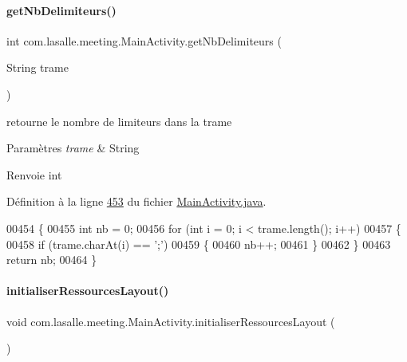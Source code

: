 \paragraph{\texorpdfstring{get\+Nb\+Delimiteurs()}{getNbDelimiteurs()}}
{\footnotesize\ttfamily int com.\+lasalle.\+meeting.\+Main\+Activity.\+get\+Nb\+Delimiteurs (\begin{DoxyParamCaption}\item[{String}]{trame }\end{DoxyParamCaption})\hspace{0.3cm}{\ttfamily [private]}}



retourne le nombre de limiteurs dans la trame 


\begin{DoxyParams}{Paramètres}
{\em trame} & String \\
\hline
\end{DoxyParams}
\begin{DoxyReturn}{Renvoie}
int 
\end{DoxyReturn}


Définition à la ligne \hyperlink{_main_activity_8java_source_l00453}{453} du fichier \hyperlink{_main_activity_8java_source}{Main\+Activity.\+java}.


\begin{DoxyCode}
00454     \{
00455         \textcolor{keywordtype}{int} nb = 0;
00456         \textcolor{keywordflow}{for} (\textcolor{keywordtype}{int} i = 0; i < trame.length(); i++)
00457         \{
00458             \textcolor{keywordflow}{if} (trame.charAt(i) == \textcolor{charliteral}{';'})
00459             \{
00460                 nb++;
00461             \}
00462         \}
00463         \textcolor{keywordflow}{return} nb;
00464     \}
\end{DoxyCode}
\mbox{\label{classcom_1_1lasalle_1_1meeting_1_1_main_activity_a2622b1b85884f9d66038adfc162b2c30}} 
\paragraph{\texorpdfstring{initialiser\+Ressources\+Layout()}{initialiserRessourcesLayout()}}
{\footnotesize\ttfamily void com.\+lasalle.\+meeting.\+Main\+Activity.\+initialiser\+Ressources\+Layout (\begin{DoxyParamCaption}{ }\end{DoxyParamCaption})}



